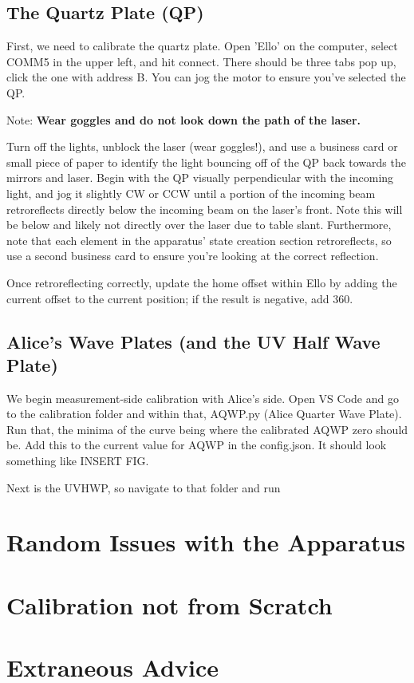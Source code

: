 \documentclass{paper}[11pt]
\begin{document}
\subsection{The Quartz Plate (QP)}
First, we need to calibrate the quartz plate. Open 'Ello' on the computer, select COMM5 in the upper left, and hit connect. There should be three tabs pop up, click the one with address B. You can jog the motor to ensure you've selected the QP. 

Note: \textbf{Wear goggles and do not look down the path of the laser.}

Turn off the lights, unblock the laser (wear goggles!), and use a business card or small piece of paper to identify the light bouncing off of the QP back towards the mirrors and laser. Begin with the QP visually perpendicular with the incoming light, and jog it slightly CW or CCW until a portion of the incoming beam retroreflects directly below the incoming beam on the laser's front. Note this will be below and likely not directly over the laser due to table slant. Furthermore, note that each element in the apparatus' state creation section retroreflects, so use a second business card to ensure you're looking at the correct reflection.

Once retroreflecting correctly, update the home offset within Ello by adding the current offset to the current position; if the result is negative, add 360. 

\subsection{Alice's Wave Plates (and the UV Half Wave Plate)}
We begin measurement-side calibration with Alice's side. Open VS Code and go to the calibration folder and within that, AQWP.py (Alice Quarter Wave Plate). Run that, the minima of the curve being where the calibrated AQWP zero should be. Add this to the current value for AQWP in the config.json. It should look something like INSERT FIG.

Next is the UVHWP, so navigate to that folder and run 


\section{Random Issues with the Apparatus}
\section{Calibration not from Scratch}
\section{Extraneous Advice}
\end{document}

